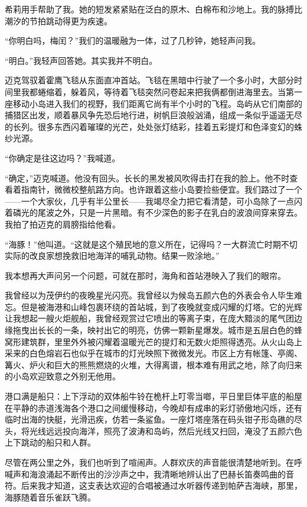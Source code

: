 \documentclass[AutoFakeBold=true]{book}
\begin{document}
希莉用手帮助了我。她的短发紧紧贴在泛白的原木、白棉布和沙地上。我的脉搏比潮汐的节拍跳动得更为疾速。

``你明白吗，梅闰？''我们的温暖融为一体，过了几秒钟，她轻声问我。

``明白。''我轻声回答她。其实我并不明白。

\vspace*{1em}

迈克驾驭着霍鹰飞毯从东面直冲首站。飞毯在黑暗中行驶了一个多小时，大部分时间里我都蜷缩着，躲着风，等待着飞毯突然问卷起来把我俩都倒进海里去。当第一座移动小岛进入我们的视野，我们距离它尚有半个小时的飞程。岛屿从它们南部的捕猎区出发，顺着暴风争先恐后地行进，树帆巨浪般汹涌，组成一条似乎遥遥无尽的长列。很多东西闪着璀璨的光芒，处处张灯结彩，挂着五彩提灯和色泽变幻的蛛纱光源。

``你确定是往这边吗？''我喊道。

``确定，''迈克喊道。他没有回头。长长的黑发被风吹得击打在我的脸上。他不时查看着指南针，微微校整航路方向。也许跟着这些小岛要捡些便宜。我们路过了一个——一个大家伙，几乎有半公里长——我竭尽全力把它看清楚，可小岛除了一点闪着磷光的尾波之外，只是一片黑暗。有不少深色的影子在乳白的波浪间穿来穿去。我拍了拍迈克的肩膀指给他看。

``海豚！''他叫道。``这就是这个殖民地的意义所在，记得吗？一大群流亡时期不切实际的改良家想挽救旧地海洋的哺乳动物。结果一败涂地。''

我本想再大声问另一个问题，可就在那时，海角和首站港映入了我们的眼帘。

我曾经以为茂伊约的夜晚星光闪亮。我曾经以为候岛五颜六色的外表会令人毕生难忘。但是被海港和山峰包裹环绕的首站城，到了夜晚就变成闪耀的灯塔。它的光辉让我想起一艘火炬舰船，我曾经观赏过它喷出的等离子束，在庞大黯淡的尾气团边缘拖曳出长长的一条，映衬出它的明亮，仿佛一颗新星爆发。城市是五层白色的蜂窝形建筑群，里里外外被闪耀着温暖光芒的提灯和无数火炬照得透亮。从火山岛上采来的白色熔岩石也似乎在城市的灯光映照下微微发光。市区上方有帐篷、亭阁、篝火、炉火和巨大的熊熊燃烧的火堆，大得离谱，根本难有用武之地，除了向归来的小岛欢迎致意之外别无他用。

港口满是船只：上下浮动的双体船牛铃在桅杆上叮零当啷，平日里巨体平底的船屋在平静的赤道浅海各个港口之间缓慢移动，今晚却有成串的彩灯骄傲地闪烁，还有临时出海的快艇，光滑迅疾，仿若一条鲨鱼。一座灯塔座落在码头钳子形岛礁的尽头，将光线远远投向海洋，照亮了波涛和岛屿，然后光线又扫回，淹没了五颜六色上下跳动的船只和人群。

尽管在两公里之外，我们也听到了喧闹声。人群欢庆的声音能很清楚地听到。在呼喊声和海浪涌起不断传出的沙沙声之中，我清晰地辨认出了巴赫长笛奏鸣曲的音符。后来我才知道，这支表达欢迎的合唱被通过水听器传递到帕萨吉海峡，那里，海豚随着音乐雀跃飞腾。
\end{document}
